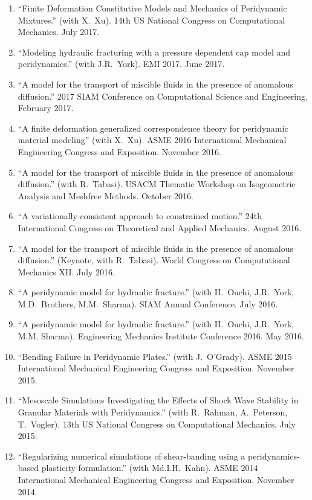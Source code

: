 \begin{etaremune}
\begin{enumerate}
    \item ``Finite Deformation Constitutive Models and Mechanics of Peridynamic Mixtures.'' (with X.\ Xu). 14th US National Congress on Computational Mechanics. July 2017.
    \item ``Modeling hydraulic fracturing with a pressure dependent cap model and peridynamics.'' (with J.R.\ York). EMI 2017. June 2017.
    \item ``A model for the transport of miscible fluids in the presence of anomalous diffusion.'' 2017 SIAM Conference on Computational Science and Engineering.  February 2017.
    \item ``A finite deformation generalized correspondence theory for peridynamic material modeling'' (with X.\ Xu). ASME 2016 International Mechanical Engineering Congress and Exposition. November 2016.
    \item ``A model for the transport of miscible fluids in the presence of anomalous diffusion.'' (with R.\ Tabasi). USACM Thematic Workshop on Isogeometric Analysis and Meshfree Methods.  October 2016.
    \item ``A variationally consistent approach to constrained motion.'' 24th International Congress on Theoretical and Applied Mechanics.  August 2016.
    \item ``A model for the transport of miscible fluids in the presence of anomalous diffusion.'' (Keynote, with R.\ Tabasi). World Congress on Computational Mechanics XII.  July 2016.
    \item ``A peridynamic model for hydraulic fracture.'' (with H.\ Ouchi, J.R.\ York, M.D.\ Brothers, M.M.\ Sharma). SIAM Annual Conference.  July 2016.
    \item ``A peridynamic model for hydraulic fracture.'' (with H.\ Ouchi, J.R.\ York, M.M. Sharma). Engineering Mechanics Institute Conference 2016. May 2016.
    \item ``Bending Failure in Peridynamic Plates.'' (with J.~O'Grady). ASME 2015 International Mechanical Engineering Congress and Exposition. November 2015.
    \item ``Mesoscale Simulations Investigating the Effects of Shock Wave Stability in Granular Materials with Peridynamics.'' (with R.~Rahman, A.~Peterson, T.~Vogler). 13th US National Congress on Computational Mechanics. July 2015.
    \item ``Regularizing numerical simulations of shear-banding using a peridynamics-based plasticity formulation.'' (with Md.I.H.~Kahn). ASME 2014 International Mechanical Engineering Congress and Exposition. November 2014.

\end{enumerate}
\end{etaremune}
